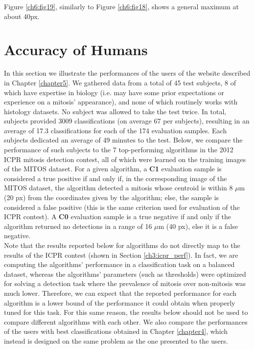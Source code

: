 Figure \ref{ch6:fig19}, similarly to Figure \ref{ch6:fig18}, shows a general maximum at about 40px.


\vspace{0.5cm}


\section{Accuracy of Humans}

In this section we illustrate the performances of the users of the website described in Chapter \ref{chapter5}.
We gathered data from a total of 45 test subjects, 8 of which have expertise in biology (i.e. may have some prior expectations or experience on a mitosis’ appearance),
and none of which routinely works with histology datasets. No subject was allowed to take the test twice. In total, subjects provided 3009 classifications
(on average 67 per subjects), resulting in an average of 17.3 classifications for each of the 174 evaluation samples.
Each subjects dedicated an average of 49 minutes to the test.
Below, we compare the performance of such subjects to the 7 top-performing algorithms in the 2012 ICPR mitosis detection contest, all of which were learned
on the training images of the MITOS dataset. For a given algorithm, a \textbf{C1} evaluation sample is considered a true positive if and only if, in the corresponding
image of the MITOS dataset, the algorithm detected a mitosis whose centroid is within 8 $\mu$m (20 px) from the coordinates given by the algorithm;
else, the sample is considered a false positive (this is the same criterion used for evaluation of the ICPR contest).
A \textbf{C0} evaluation sample is a true negative if and only if the algorithm
returned no detections in a range of 16 $\mu$m (40 px), else it is a false negative.\\
Note that the results reported below for algorithms do not directly map
to the results of the ICPR contest (shown in Section \ref{ch3:icpr_perf}). In fact, we are computing the algorithms’
performance in a classification task on a balanced dataset, whereas the algorithms’ parameters (such as thresholds) were optimized for solving a detection
task where the prevalence of mitosis over non-mitosis was much lower. Therefore, we can expect that the reported performance for each algorithm is a lower
bound of the performance it could obtain when properly tuned for this task.
For this same reason, the results below should not be used to compare different algorithms with each other.
We also compare the performances of the users with best classifications obtained in Chapter \ref{chapter4}, which instead is designed on the same problem
as the one presented to the users.


